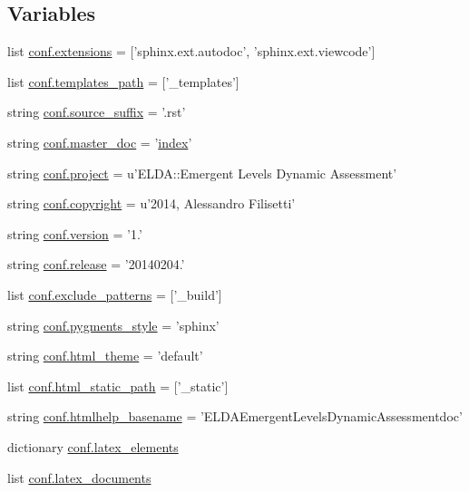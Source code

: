 \subsection*{Variables}
\begin{DoxyCompactItemize}
\item 
list \hyperlink{a00134_ae475e080536acb271a0a0efe56c3ba42}{conf.\+extensions} = \mbox{[}'sphinx.\+ext.\+autodoc', 'sphinx.\+ext.\+viewcode'\mbox{]}
\item 
list \hyperlink{a00134_ae850ae634911b713e036b43894fdd525}{conf.\+templates\+\_\+path} = \mbox{[}'\+\_\+templates'\mbox{]}
\item 
string \hyperlink{a00134_a10af2a769eb3bd3322e874f677e435b1}{conf.\+source\+\_\+suffix} = '.rst'
\item 
string \hyperlink{a00134_a6fcd7e5236f355b1e1a55f9d95988810}{conf.\+master\+\_\+doc} = '\hyperlink{a00102_a0cd6a44ffb07342cbc7e5ac33bfc9495}{index}'
\item 
string \hyperlink{a00134_a45653c983098153b78e33600e39230eb}{conf.\+project} = u'E\+L\+D\+A\+::\+Emergent Levels Dynamic Assessment'
\item 
string \hyperlink{a00134_a33fa97cf51dcb25970fbf53f10159589}{conf.\+copyright} = u'2014, Alessandro Filisetti'
\item 
string \hyperlink{a00134_ade15c5b54093b64d7c428ec19ca5b1cb}{conf.\+version} = '1.'
\item 
string \hyperlink{a00134_a325dc746d8bf05c54d26351c35a21d90}{conf.\+release} = '20140204.'
\item 
list \hyperlink{a00134_a7ad48fb6f3e9b129c02346ea0d3527c1}{conf.\+exclude\+\_\+patterns} = \mbox{[}'\+\_\+build'\mbox{]}
\item 
string \hyperlink{a00134_a641130e096b26cba8a5d63ed38684de7}{conf.\+pygments\+\_\+style} = 'sphinx'
\item 
string \hyperlink{a00134_a6c3bfcc1a44546c1c75ce20f55bd0fd6}{conf.\+html\+\_\+theme} = 'default'
\item 
list \hyperlink{a00134_af4fb5d8851ccaade135c2668dd3ced41}{conf.\+html\+\_\+static\+\_\+path} = \mbox{[}'\+\_\+static'\mbox{]}
\item 
string \hyperlink{a00134_aab7fddb2766ce3c430d8246fbfdbc7b1}{conf.\+htmlhelp\+\_\+basename} = 'E\+L\+D\+A\+Emergent\+Levels\+Dynamic\+Assessmentdoc'
\item 
dictionary \hyperlink{a00134_a33619d385ad23765ac6ebb58bf82d43d}{conf.\+latex\+\_\+elements}
\item 
list \hyperlink{a00134_a7812f49970f3de0d15dd7b9b9a10e3a1}{conf.\+latex\+\_\+documents}

\end{DoxyCompactItemize}
